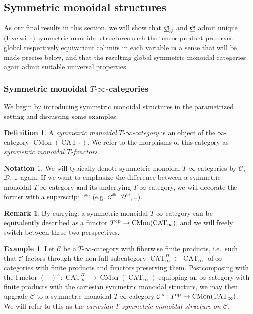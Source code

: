 \documentclass[reqno]{memo-l}
\theoremstyle{mythm}
\theoremstyle{definition}
\newtheorem{rk}[thm]{Remark}
\newtheorem{ex}[thm]{Example}
\newtheorem{notation}[thm]{Notation}
\newtheorem{definition}[thm]{Definition}
\numberwithin{equation}{section}
\newcommand{\Cc}{{\mathcal{C}}}
\newcommand{\Dd}{{\mathcal{D}}}
\newcommand{\gl}{\textup{gl}}
\DeclareMathOperator{\CAT}{CAT}
\DeclareMathOperator{\CMon}{CMon}
\newcommand{\op}{{\textup{op}}}
\newcommand{\ulhelper}[2]{\underline{\setbox0=\hbox{$#1#2$}\dp0=0.4pt \box0\relax}}
\newcommand{\ul}[1]{{\mathpalette\ulhelper{#1}}\hbox{\rule[-2pt]{0pt}{0pt}}}
\newcommand{\myS}{{{\mathfrak S\kern-.4pt}}}
\begin{document}
\subsection{Symmetric monoidal structures}\label{subsec:sym-mon}
As our final results in this section, we will show that $\ul\myS_\gl$ and $\ul\myS$ admit unique (levelwise) symmetric monoidal structures such the tensor product preserves global respectively equivariant colimits in each variable in a sense that will be made precise below, and that the resulting global symmetric monoidal categories again admit suitable universal properties.

\medskip
\subsubsection{Symmetric monoidal $T$-$\infty$-categories} We begin by introducing symmetric monoidal structures in the parametrized setting and discussing some examples.

\begin{definition}
    A \emph{symmetric monoidal $T$-$\infty$-category} is an object of the $\infty$-category $\CMon(\CAT_T)$. We refer to the morphisms of this category as \emph{symmetric monoidal $T$-functors}.
\end{definition}

\begin{notation}
    We will typically denote symmetric monoidal $T$-$\infty$-categories by $\Cc$, $\Dd$,\,\dots\ again. If we want to emphasize the difference between a symmetric monoidal $T$-$\infty$-category and its underlying $T$-$\infty$-category, we will decorate the former with a superscript `${}^\otimes$' (e.g. $\Cc^\otimes$, $\Dd^\otimes$,\,\dots).
\end{notation}

\begin{rk}
    By currying, a symmetric monoidal $T$-$\infty$-category can be equivalently described as a functor $T^\op\to\CMon(\CAT_\infty)$, and we will freely switch between these two perspectives.
\end{rk}

\begin{ex}\label{ex:cartesian-sym-mon}
    Let $\Cc$ be a $T$-$\infty$-category with fiberwise finite products, i.e.~such that $\Cc$ factors through the non-full subcategory $\CAT^{\Pi}_\infty\subset\CAT_\infty$ of $\infty$-categories with finite products and functors preserving them. Postcomposing with the functor $(-)^\times\colon\CAT^\Pi_\infty\to\CMon(\CAT_\infty)$ equipping an $\infty$-category with finite products with the cartesian symmetric monoidal structure, we may then upgrade $\Cc$ to a symmetric monoidal $T$-$\infty$-category $\Cc^\times\colon T^\op\to\CMon(\CAT_\infty)$. We will refer to this as the \emph{cartesian $T$-symmetric monoidal structure on $\Cc$}.
\end{ex}
\end{document}
